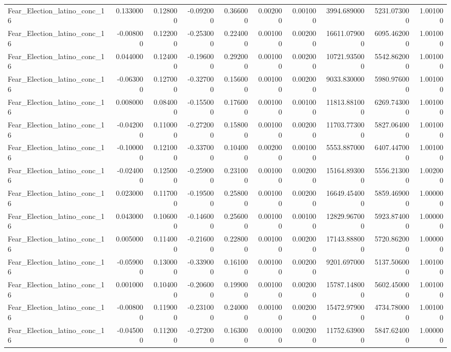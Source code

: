\begin{table}
\begin{tabular}{lrrrrrrrrr}
Fear_Election_latino_conc_16 & 0.133000 & 0.128000 & -0.092000 & 0.366000 & 0.002000 & 0.001000 & 3994.689000 & 5231.073000 & 1.001000 \\
Fear_Election_latino_conc_16 & -0.008000 & 0.122000 & -0.253000 & 0.224000 & 0.001000 & 0.002000 & 16611.079000 & 6095.462000 & 1.001000 \\
Fear_Election_latino_conc_16 & 0.044000 & 0.124000 & -0.196000 & 0.292000 & 0.001000 & 0.002000 & 10721.935000 & 5542.862000 & 1.001000 \\
Fear_Election_latino_conc_16 & -0.063000 & 0.127000 & -0.327000 & 0.156000 & 0.001000 & 0.002000 & 9033.830000 & 5980.976000 & 1.001000 \\
Fear_Election_latino_conc_16 & 0.008000 & 0.084000 & -0.155000 & 0.176000 & 0.001000 & 0.001000 & 11813.881000 & 6269.743000 & 1.001000 \\
Fear_Election_latino_conc_16 & -0.042000 & 0.110000 & -0.272000 & 0.158000 & 0.001000 & 0.002000 & 11703.773000 & 5827.064000 & 1.001000 \\
Fear_Election_latino_conc_16 & -0.100000 & 0.121000 & -0.337000 & 0.104000 & 0.002000 & 0.001000 & 5553.887000 & 6407.447000 & 1.001000 \\
Fear_Election_latino_conc_16 & -0.024000 & 0.125000 & -0.259000 & 0.231000 & 0.001000 & 0.002000 & 15164.893000 & 5556.213000 & 1.002000 \\
Fear_Election_latino_conc_16 & 0.023000 & 0.117000 & -0.195000 & 0.258000 & 0.001000 & 0.002000 & 16649.454000 & 5859.469000 & 1.000000 \\
Fear_Election_latino_conc_16 & 0.043000 & 0.106000 & -0.146000 & 0.256000 & 0.001000 & 0.001000 & 12829.967000 & 5923.874000 & 1.000000 \\
Fear_Election_latino_conc_16 & 0.005000 & 0.114000 & -0.216000 & 0.228000 & 0.001000 & 0.002000 & 17143.888000 & 5720.862000 & 1.000000 \\
Fear_Election_latino_conc_16 & -0.059000 & 0.130000 & -0.339000 & 0.161000 & 0.001000 & 0.002000 & 9201.697000 & 5137.506000 & 1.001000 \\
Fear_Election_latino_conc_16 & 0.001000 & 0.104000 & -0.206000 & 0.199000 & 0.001000 & 0.002000 & 15787.148000 & 5602.450000 & 1.001000 \\
Fear_Election_latino_conc_16 & -0.008000 & 0.119000 & -0.231000 & 0.240000 & 0.001000 & 0.002000 & 15472.979000 & 4734.780000 & 1.001000 \\
Fear_Election_latino_conc_16 & -0.045000 & 0.112000 & -0.272000 & 0.163000 & 0.001000 & 0.002000 & 11752.639000 & 5847.624000 & 1.000000 \\

\end{tabular}
\end{table}
